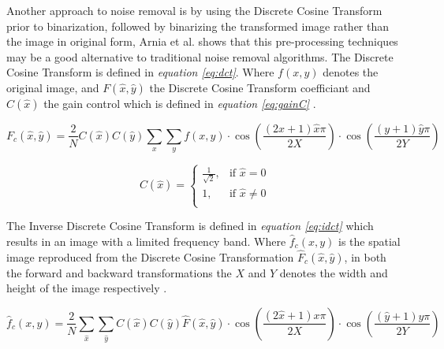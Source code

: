 \documentclass[11pt]{article}
\begin{document}
			Another approach to noise removal is by using the Discrete Cosine Transform prior to binarization, followed by binarizing the transformed image rather than the image in original form, Arnia et al. \cite{arnia2014improvement} shows that this pre-processing techniques may be a good alternative to traditional noise removal algorithms. The Discrete Cosine Transform is defined in \textit{equation \ref{eq:dct}}. Where $f(x, y)$ denotes the original image, and $F(\hat{x}, \hat{y})$ the Discrete Cosine Transform coefficiant and $C(\hat{x})$ the gain control which is defined in \textit{equation \ref{eq:gainC}} \cite{arnia2014improvement}.

			\begin{large}
			\begin{equation} \label{eq:dct}
				F_c(\hat{x},\hat{y}) = \frac{2}{N} C(\hat{x})C(\hat{y})\sum_{x}\sum_{y}f(x, y) \cdot \cos(\frac{(2x + 1)\hat{x}\pi}{2X}) \cdot \cos(\frac{(y + 1) \hat{y} \pi}{2Y})
			\end{equation}
			\end{large}

			\begin{Large}
			\begin{equation} \label{eq:gainC}
			 C(\hat{x}) =
			 \begin{cases}
				\frac{1}{\sqrt{2}},          & \text{if } \hat{x} = 0     \\
				1, & \text{if } \hat{x} \neq 0 \\
			 \end{cases}
			\end{equation}
			\end{Large}

			The Inverse Discrete Cosine Transform is defined in \textit{equation \ref{eq:idct}} which results in an image with a limited frequency band. Where $\hat{f}_c(x,y)$ is the spatial image reproduced from the Discrete Cosine Transformation $\hat{F}_c(\hat{x}, \hat{y})$, in both the forward and backward transformations the $X$ and $Y$ denotes the width and height of the image respectively \cite{arnia2014improvement}.

			\begin{large}
			\begin{equation} \label{eq:idct}
				\hat{f}_c(x,y) = \frac{2}{N} \sum_{\hat{x}}\sum_{\hat{y}} C(\hat{x})C(\hat{y})\hat{F}(\hat{x}, \hat{y}) \cdot \cos(\frac{(2\hat{x} + 1)x\pi}{2X}) \cdot \cos(\frac{(\hat{y} + 1) y \pi}{2Y})
			\end{equation}
			\end{large}
\end{document}
